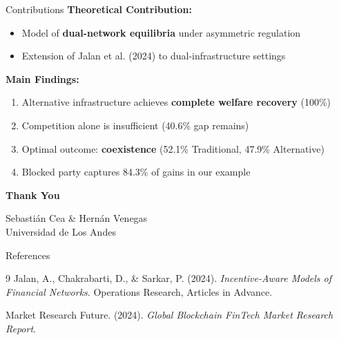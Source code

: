 \documentclass[aspectratio=169]{beamer}
\begin{document}
\begin{frame}{Contributions}
    \textbf{Theoretical Contribution:}
    \begin{itemize}
        \item Model of \textbf{dual-network equilibria} under asymmetric regulation
        \item Extension of Jalan et al. (2024) to dual-infrastructure settings
    \end{itemize}
    
    \vspace{0.5cm}
    \textbf{Main Findings:}
    \begin{enumerate}
        \item Alternative infrastructure achieves \textbf{complete welfare recovery} (100\%)
        \item Competition alone is insufficient (40.6\% gap remains)
        \item Optimal outcome: \textbf{coexistence} (52.1\% Traditional, 47.9\% Alternative)
        \item Blocked party captures 84.3\% of gains in our example
    \end{enumerate}
    
\end{frame}

\begin{frame}
    \centering
    \Huge \textbf{Thank You}
    
    \vspace{1cm}
    
    \vspace{0.5cm}
    \normalsize
    Sebastián Cea \& Hernán Venegas \\
    Universidad de Los Andes
    
\end{frame}

\begin{frame}[allowframebreaks]{References}
\begin{thebibliography}{9}
Jalan, A., Chakrabarti, D., \& Sarkar, P. (2024). 
\textit{Incentive-Aware Models of Financial Networks}. 
Operations Research, Articles in Advance.



Market Research Future. (2024). 
\textit{Global Blockchain FinTech Market Research Report}.

\end{thebibliography}
\end{frame}
\end{document}
